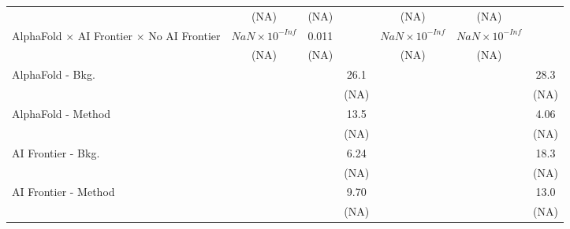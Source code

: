 \begin{tabular}{lcccccc}
                                                                              & (NA)                   & (NA)  &                        & (NA)                   & (NA)                   &   \\   
   AlphaFold $\times$ AI Frontier $\times$ No AI Frontier                     & $NaN\times 10^{-Inf}$  & 0.011 &                        & $NaN\times 10^{-Inf}$  & $NaN\times 10^{-Inf}$  &   \\   
                                                                              & (NA)                   & (NA)  &                        & (NA)                   & (NA)                   &   \\   
   AlphaFold - Bkg.                                                           &                        &       & 26.1                   &                        &                        & 28.3\\   
                                                                              &                        &       & (NA)                   &                        &                        & (NA)\\   
   AlphaFold - Method                                                         &                        &       & 13.5                   &                        &                        & 4.06\\   
                                                                              &                        &       & (NA)                   &                        &                        & (NA)\\   
   AI Frontier - Bkg.                                                         &                        &       & 6.24                   &                        &                        & 18.3\\   
                                                                              &                        &       & (NA)                   &                        &                        & (NA)\\   
   AI Frontier - Method                                                       &                        &       & 9.70                   &                        &                        & 13.0\\   
                                                                              &                        &       & (NA)                   &                        &                        & (NA)\\   

\end{tabular}
